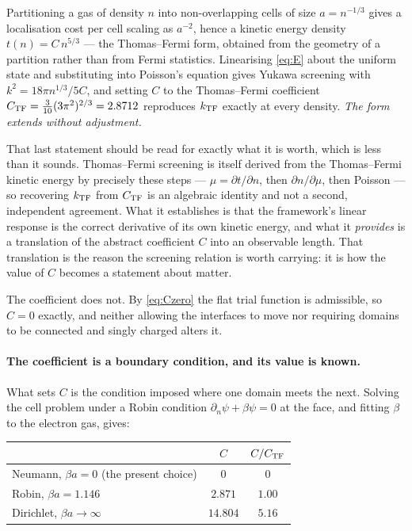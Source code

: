 \documentclass[11pt]{article}
\begin{document}
Partitioning a gas of density $n$ into non-overlapping cells of size $a=n^{-1/3}$ gives a
localisation cost per cell scaling as $a^{-2}$, hence a kinetic energy density $t(n)=C\,n^{5/3}$ ---
the Thomas--Fermi form, obtained from the geometry of a partition rather than from Fermi statistics.
Linearising \eqref{eq:E} about the uniform state and substituting into Poisson's equation gives
Yukawa screening with $k^2=18\pi n^{1/3}/5C$, and setting $C$ to the Thomas--Fermi coefficient
$C_{\rm TF}=\tfrac{3}{10}(3\pi^2)^{2/3}=2.8712$ reproduces $k_{\rm TF}$ exactly at every density.
\emph{The form extends without adjustment.}

That last statement should be read for exactly what it is worth, which is less than it sounds.
Thomas--Fermi screening is itself derived from the Thomas--Fermi kinetic energy by precisely these
steps --- $\mu=\partial t/\partial n$, then $\partial n/\partial\mu$, then Poisson --- so
recovering $k_{\rm TF}$ from $C_{\rm TF}$ is an algebraic identity and not a second, independent
agreement. What it establishes is that the framework's linear response is the correct derivative of
its own kinetic energy, and what it \emph{provides} is a translation of the abstract coefficient $C$
into an observable length. That translation is the reason the screening relation is worth carrying:
it is how the value of $C$ becomes a statement about matter.

The coefficient does not. By \eqref{eq:Czero} the flat trial function is admissible, so $C=0$
exactly, and neither allowing the interfaces to move nor requiring domains to be connected and singly
charged alters it.

\paragraph{The coefficient is a boundary condition, and its value is known.} What sets $C$ is the
condition imposed where one domain meets the next. Solving the cell problem under a Robin condition
$\partial_n\psi+\beta\psi=0$ at the face, and fitting $\beta$ to the electron gas, gives:

\begin{center}
\small
\begin{tabular}{@{}lcc@{}}
\toprule
 & $C$ & $C/C_{\rm TF}$\\
\midrule
Neumann, $\beta a=0$ (the present choice) & $0$ & $0$\\
Robin, $\beta a=1.146$ & $2.871$ & $\mathbf{1.00}$\\
Dirichlet, $\beta a\to\infty$ & $14.804$ & $5.16$\\
\bottomrule
\end{tabular}
\end{center}
\end{document}
